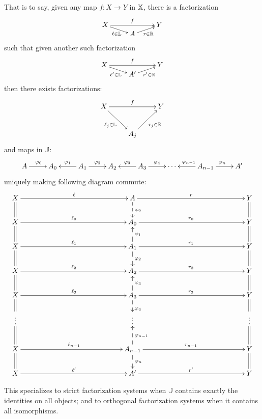 \begin{definition}
That is to say, given any map $f:X\to Y$ in $\mathbb{X}$, there is a factorization
$$\xymatrixrowsep{0mm}
\xymatrix{
X  \ar[rr]^{f} \ar[dr]_{\ell \in {\mathbb L}} &       & Y\\
   & A \ar[ur]_{r \in {\mathbb R}}
}
$$\xymatrixrowsep{0mm}
such that given another such factorization
$$\xymatrixrowsep{0mm}
\xymatrix{
X  \ar[rr]^{f} \ar[dr]_{\ell' \in {\mathbb L}} &       & Y\\
   & A' \ar[ur]_{r'  \in {\mathbb R}}
}
$$
%
%
%
then there exists factorizations:
$$
\xymatrix{
X  \ar[rr]^{f} \ar[dr]_{\ell_j\in {\mathbb L}} &       & Y\\
   & A_j \ar[ur]_{r_j \in {\mathbb R}}
}
$$
and  maps in $\mathbb J$:
$$
\xymatrix{
A \ar[r]^{\phi_0}
& A_0 
& A_1 \ar[l]_{\phi_1} \ar[r]^{\phi_2}
& A_2 
& A_3 \ar[l]_{\phi_3} \ar[r]^{\phi_4}
&\cdots
& A_{n-1} \ar[l]_{\phi_{n-1}} \ar[r]^{\phi_n}
& A'
}
$$
uniquely making following diagram commute:
$$
\xymatrixrowsep{7mm}
\xymatrixcolsep{50mm}
\xymatrix{
X   \ar[r]^{\ell}\ar@{=}[d]              & A \ar@{-->}[d]^{\phi_0} \ar[r]^{r}                                               & Y \ar@{=}[d]\\
X   \ar[r]^{\ell_0}\ar@{=}[d]          & A_0  \ar[r]^{r_0}                                                                          & Y\ar@{=}[d]\\
X   \ar[r]^{\ell_1}\ar@{=}[d]           & A_1 \ar@{-->}[u]_{\phi_1} \ar@{-->}[d]^{\phi_2} \ar[r]^{r_1}  & Y \ar@{=}[d]\\
X   \ar[r]^{\ell_2}\ar@{=}[d]           & A_2 \ar[r]^{r_2}                                                                             & Y \ar@{=}[d]\\
X   \ar[r]^{\ell_3}\ar@{=}[d]         & A_ 3\ar@{-->}[u]_{\phi_3} \ar@{-->}[d]^{\phi_4}\ar[r]^{r_3}   & Y \ar@{=}[d]\\
 \vdots\ar@{=}[d]         & \vdots & \vdots \ar@{=}[d] \\
X   \ar[r]^{\ell_{n-1}}\ar@{=}[d]   & A_{n-1}  \ar@{-->}[u]_{\phi_{n-1}} \ar@{-->}[d]^{\phi_n}  \ar[r]^{r_{n-1}}         & Y    \ar@{=}[d]\\
X   \ar[r]^{\ell'}                         & A'   \ar[r]^{r'} & Y
}
$$
\end{definition}
\endgroup
This specializes to strict factorization systems when $\mathbb J$ contains exactly the identities on all objects; and to orthogonal factorization systems when it contains all isomorphisms. 


